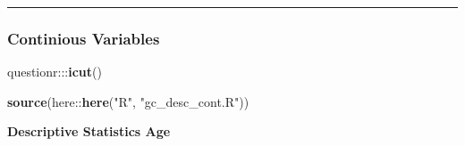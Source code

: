 \documentclass[
]{article}
\newenvironment{Shaded}{\begin{snugshade}}{\end{snugshade}}
\newcommand{\DataTypeTok}[1]{\textcolor[rgb]{0.00,0.34,0.68}{#1}}
\newcommand{\KeywordTok}[1]{\textcolor[rgb]{0.12,0.11,0.11}{\textbf{#1}}}
\newcommand{\NormalTok}[1]{\textcolor[rgb]{0.12,0.11,0.11}{#1}}
\newcommand{\OperatorTok}[1]{\textcolor[rgb]{0.12,0.11,0.11}{#1}}
\newcommand{\OtherTok}[1]{\textcolor[rgb]{0.00,0.43,0.16}{#1}}
\newcommand{\StringTok}[1]{\textcolor[rgb]{0.75,0.01,0.01}{#1}}
\begin{document}
\pagebreak

\begin{center}\rule{0.5\linewidth}{0.5pt}\end{center}

\hypertarget{continious-variables}{%
\subsubsection{Continious Variables}\label{continious-variables}}

\begin{Shaded}
\begin{Highlighting}[]
\NormalTok{questionr}\OperatorTok{:::}\KeywordTok{icut}\NormalTok{()}
\end{Highlighting}
\end{Shaded}

\begin{Shaded}
\begin{Highlighting}[]
\KeywordTok{source}\NormalTok{(here}\OperatorTok{::}\KeywordTok{here}\NormalTok{(}\StringTok{"R"}\NormalTok{, }\StringTok{"gc_desc_cont.R"}\NormalTok{))}
\end{Highlighting}
\end{Shaded}

\textbf{Descriptive Statistics Age}

\begin{Shaded}
\end{Shaded}
\end{document}
